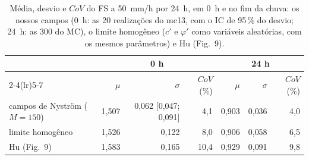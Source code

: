 \begin{table}[htbp]\centering\footnotesize
\caption{Média, desvio e $CoV$ do FS a 50~mm/h por 24~h, em 0~h e no fim da chuva: os nossos campos (0~h: as 20 realizações do mc13, com o IC de 95\,\% do desvio; 24~h: as 300 do MC), o limite homogêneo ($c'$ e $\varphi'$ como variáveis aleatórias, com os mesmos parâmetros) e Hu (Fig.~9).}\label{tab:desvio}
\begin{tabular}{lrrrrrr}\toprule
 & \multicolumn{3}{c}{0 h} & \multicolumn{3}{c}{24 h} \\\cmidrule(lr){2-4}\cmidrule(lr){5-7}
 & $\mu$ & $\sigma$ & $CoV$ (\%) & $\mu$ & $\sigma$ & $CoV$ (\%) \\\midrule
campos de Nyström ($M = 150$) & 1{,}507 & 0{,}062 [0{,}047; 0{,}091] & 4{,}1 & 0{,}903 & 0{,}036 & 4{,}0 \\
limite homogêneo & 1{,}526 & 0{,}122 & 8{,}0 & 0{,}906 & 0{,}058 & 6{,}5 \\
Hu (Fig.~9) & 1{,}583 & 0{,}165 & 10{,}4 & 0{,}929 & 0{,}091 & 9{,}8 \\
\bottomrule\end{tabular}\end{table}
